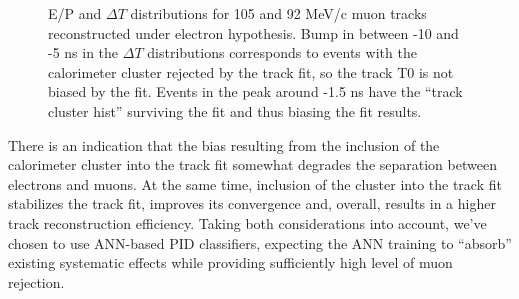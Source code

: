 \begin{figure}[H]
\hspace{-0.6in}
  \caption{
  \label{fig:pid_ep_dt}
    E/P and $\Delta T$ distributions for 105 and 92 MeV/c muon tracks reconstructed under electron
    hypothesis. Bump in between -10 and -5 ns in the $\Delta T$ distributions corresponds to events 
    with the calorimeter cluster rejected by the track fit, so the track T0 is not biased by the fit.
    Events in the peak around -1.5 ns have the ``track cluster hist'' surviving the fit and thus
    biasing the fit results.
  }
\end{figure}

There is an indication that the bias resulting from the inclusion of the calorimeter cluster
into the track fit somewhat degrades the separation between electrons and muons.
%
At the same time, inclusion of the cluster into the track fit stabilizes the track fit, improves its
convergence and, overall, results in a higher track reconstruction efficiency.
%
Taking both considerations into account, we've chosen to use ANN-based PID classifiers,
expecting the ANN training to ``absorb'' existing systematic effects while providing sufficiently
high level of muon rejection.

